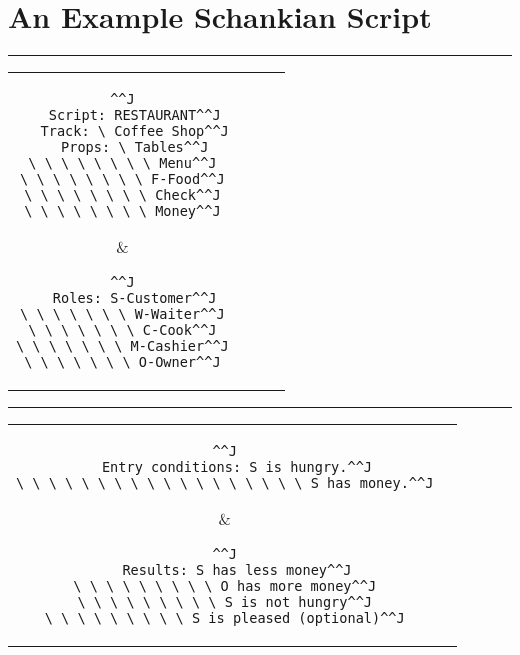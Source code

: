 \makeatletter
\let\savedchap\@makechapterhead
\def\@makechapterhead{\vspace*{-5cm}\savedchap}
\chapter{An Example Schankian Script}
\let\@makechapterhead\savedchap
\makeatletter
\label{appendix:egschankscript}

\vspace*{-1cm}


\par\noindent\rule{\textwidth}{0.4pt}
\begin{tabular*}{\textwidth}{c c c c}
  \parbox{0.5\textwidth}{\begin{lstlisting}^^J
   Script: RESTAURANT^^J
   Track: \ Coffee Shop^^J
   Props: \ Tables^^J
\ \ \ \ \ \ \ \ Menu^^J
\ \ \ \ \ \ \ \ F-Food^^J
\ \ \ \ \ \ \ \ Check^^J
\ \ \ \ \ \ \ \ Money^^J
  \end{lstlisting}
  } & \parbox{0.5\textwidth}{\begin{lstlisting}^^J
   Roles: S-Customer^^J
\ \ \ \ \ \ \ W-Waiter^^J
\ \ \ \ \ \ \ C-Cook^^J
\ \ \ \ \ \ \ M-Cashier^^J
\ \ \ \ \ \ \ O-Owner^^J
  \end{lstlisting}}
 \end{tabular*}
 
\par\noindent\rule{\textwidth}{0.4pt}
\begin{tabular*}{\textwidth}{c c}
\parbox{0.5\textwidth}{\begin{lstlisting}^^J
   Entry conditions: S is hungry.^^J
\ \ \ \ \ \ \ \ \ \ \ \ \ \ \ \ \ \ S has money.^^J
\end{lstlisting}} & \parbox{0.5\textwidth}{\begin{lstlisting}^^J
   Results: S has less money^^J
\ \ \ \ \ \ \ \ \ O has more money^^J
\ \ \ \ \ \ \ \ \ S is not hungry^^J
\ \ \ \ \ \ \ \ \ S is pleased (optional)^^J
\end{lstlisting}}
 \end{tabular*}
 
